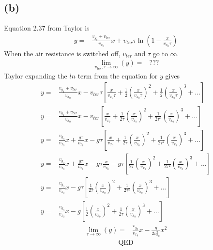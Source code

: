 \documentclass[12pt, a4paper]{article}
\begin{document}
\subsection*{(b)}
Equation 2.37 from Taylor is 
\begin{align*}
y =& \frac{v_{y_0}+v_{ter}}{v_{x_0}}x + v_{ter}\tau\ln\left( 1 - \frac{x}{v_{x_0}\tau} \right)
\end{align*}
When the air resistance is switched off, $v_{ter}$ and $\tau$ go to $\infty$.
\begin{align*}
\lim_{v_{ter}, \tau \rightarrow\infty} (y) =& ???
\end{align*}
Taylor expanding the $ln$ term from the equation for $y$ gives
\begin{align*}
y =& \frac{v_{y_0}+v_{ter}}{v_{x_0}}x - v_{ter}\tau \left[
\frac{x}{v_{x_0}\tau} + 
\frac{1}{2}\left( \frac{x}{v_{x_0}\tau} \right)^2 +
\frac{1}{2}\left( \frac{x}{v_{x_0}\tau} \right)^3 + \dots
\right]
\\
y =& \frac{v_{y_0}+v_{ter}}{v_{x_0}}x - v_{ter}\left[
\frac{x}{v_{x_0}} + 
\frac{1}{2\tau}\left( \frac{x}{v_{x_0}} \right)^2 +
\frac{1}{2\tau^2}\left( \frac{x}{v_{x_0}} \right)^3 + \dots
\right]
\\
y =& \frac{v_{y_0}}{v_{x_0}}x + \frac{g\tau}{v_{x_0}}x - g\tau\left[
\frac{x}{v_{x_0}} + 
\frac{1}{2\tau}\left( \frac{x}{v_{x_0}} \right)^2 +
\frac{1}{2\tau^2}\left( \frac{x}{v_{x_0}} \right)^3 + \dots
\right]
\\
y =& \frac{v_{y_0}}{v_{x_0}}x + \frac{g\tau}{v_{x_0}}x - g\tau
\frac{x}{v_{x_0}} - 
g\tau \left[
\frac{1}{2\tau}\left( \frac{x}{v_{x_0}} \right)^2 +
\frac{1}{2\tau^2}\left( \frac{x}{v_{x_0}} \right)^3 + \dots
\right]
\\
y =& \frac{v_{y_0}}{v_{x_0}}x - 
g\tau \left[
\frac{1}{2\tau}\left( \frac{x}{v_{x_0}} \right)^2 +
\frac{1}{2\tau^2}\left( \frac{x}{v_{x_0}} \right)^3 + \dots
\right]
\\
y =& \frac{v_{y_0}}{v_{x_0}}x - 
g \left[
\frac{1}{2}\left( \frac{x}{v_{x_0}} \right)^2 +
\frac{1}{2\tau}\left( \frac{x}{v_{x_0}} \right)^3 + \dots
\right]
\end{align*} 
\begin{align*}
\lim_{\tau\rightarrow\infty}(y) =& \boxed{\frac{v_{y_0}}{v_{x_0}}x - 
\frac{g}{2v_{x_0}^2}x^2 }
\end{align*}
\begin{align*}
\text{QED}
\end{align*}
\end{document}
